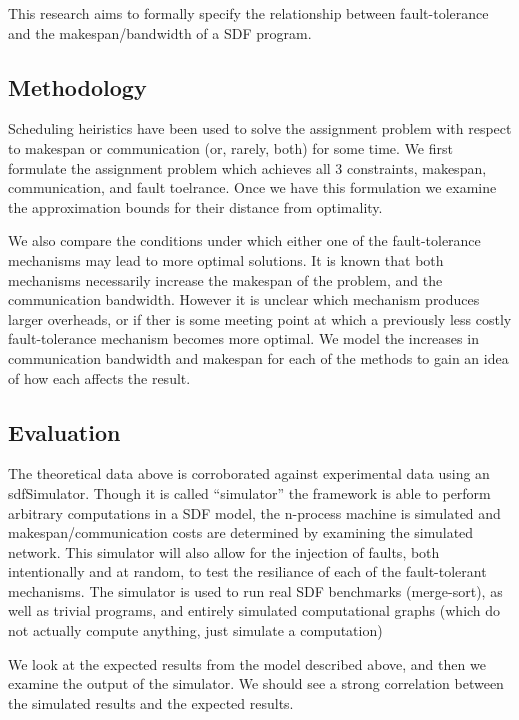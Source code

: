 This research aims to formally specify the relationship between fault-tolerance and the makespan/bandwidth of a SDF program.


\subsection*{Methodology}

Scheduling heiristics have been used to solve the assignment problem with respect to makespan \cite{len87} or communication \cite{boy01} (or, rarely, both) for some time.
We first formulate the assignment problem which achieves all 3 constraints, makespan, communication, and fault toelrance.
Once we have this formulation we examine the approximation bounds for their distance from optimality.

We also compare the conditions under which either one of the fault-tolerance mechanisms may lead to more optimal solutions.
It is known that both mechanisms necessarily increase the makespan of the problem, and the communication bandwidth.
However it is unclear which mechanism produces larger overheads, or if ther is some meeting point at which a previously less costly fault-tolerance mechanism becomes more optimal.
We model the increases in communication bandwidth and makespan for each of the methods to gain an idea of how each affects the result.

\subsection*{Evaluation}

The theoretical data above is corroborated against experimental data using an sdfSimulator.
Though it is called ``simulator'' the framework is able to perform arbitrary computations in a SDF model, the n-process machine is simulated and makespan/communication costs are determined by examining the simulated network.
This simulator will also allow for the injection of faults, both intentionally and at random, to test the resiliance of each of the fault-tolerant mechanisms.
The simulator is used to run real SDF benchmarks (merge-sort), as well as trivial programs, and entirely simulated computational graphs (which do not actually compute anything, just simulate a computation)

We look at the expected results from the model described above, and then we examine the output of the simulator.
We should see a strong correlation between the simulated results and the expected results.






